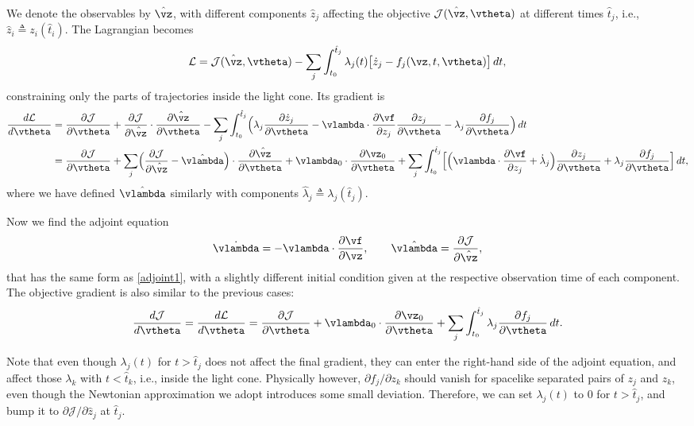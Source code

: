 \documentclass[modern, trackchanges, dvipsnames]{aastex631}
\renewcommand{\d}{d}
\newcommand{\p}{\partial}
\newcommand{\cJ}{\mathcal{J}}
\newcommand{\cL}{\mathcal{L}}
\begin{document}
We denote the observables by $\hat\vz$, with different components $\hat
z_j$ affecting the objective $\cJ(\hat\vz, \vtheta)$ at different times
$\hat t_j$, i.e., $\hat z_i \triangleq z_i(\hat t_i)$.
The Lagrangian becomes
%
\begin{equation}
\cL = \cJ(\hat\vz, \vtheta)
- \sum_j \int_{t_0}^{\hat t_j} \lambda_j(t)
  \bigl[ \dot z_j - f_j(\vz, t, \vtheta) \bigr] \, \d t,
\end{equation}
%
constraining only the parts of trajectories inside the light cone.
Its gradient is
%
\begin{align}
\frac{\d\cL}{\d\vtheta}
&= \frac{\p\cJ}{\p\vtheta}
+ \frac{\p\cJ}{\p\hat\vz} \cdot \frac{\p\hat\vz}{\p\vtheta}
- \sum_j \int_{t_0}^{\hat t_j}
  \Bigl( \lambda_j \frac{\p\dot z_j}{\p\vtheta}
    - \vlambda \cdot \frac{\p\vf}{\p z_j} \frac{\p z_j}{\p\vtheta}
    - \lambda_j \frac{\p f_j}{\p\vtheta} \Bigr) \, \d t \\
%
&= \frac{\p\cJ}{\p\vtheta}
+ \sum_j \Bigl( \frac{\p\cJ}{\p\hat\vz} - \hat\vlambda \Bigr)
  \cdot \frac{\p\hat\vz}{\p\vtheta}
+ \vlambda_0 \cdot \frac{\p\vz_0}{\p\vtheta}
+ \sum_j \int_{t_0}^{\hat t_j} \Bigl[
  \Bigl( \vlambda \cdot \frac{\p\vf}{\p z_j} + \dot\lambda_j \Bigr)
  \frac{\p z_j}{\p\vtheta}
  + \lambda_j \frac{\p f_j}{\p\vtheta} \Bigr] \, \d t, \nonumber
\end{align}
%
where we have defined $\hat\vlambda$ similarly with components
$\hat\lambda_j \triangleq \lambda_j(\hat t_j)$.

Now we find the adjoint equation
%
\begin{equation}
\dot\vlambda = - \vlambda \cdot \frac{\p\vf}{\p\vz},
\qquad
\hat\vlambda = \frac{\p\cJ}{\p\hat\vz},
\end{equation}
%
that has the same form as \eqref{adjoint1}, with a slightly different
initial condition given at the respective observation time of each
component.
The objective gradient is also similar to the previous cases:
%
\begin{equation}
\frac{\d\cJ}{\d\vtheta}
= \frac{\d\cL}{\d\vtheta}
= \frac{\p\cJ}{\p\vtheta} + \vlambda_0 \cdot \frac{\p\vz_0}{\p\vtheta}
+ \sum_j \int_{t_0}^{\hat t_j} \lambda_j \frac{\p f_j}{\p\vtheta} \, \d t.
\end{equation}

Note that even though $\lambda_j(t)$ for $t > \hat t_j$ does not affect
the final gradient, they can enter the right-hand side of the adjoint
equation, and affect those $\lambda_k$ with $t < \hat t_k$, i.e., inside
the light cone.
Physically however, $\p f_j / \p z_k$ should vanish for spacelike
separated pairs of $z_j$ and $z_k$, even though the Newtonian
approximation we adopt introduces some small deviation.
Therefore, we can set $\lambda_j(t)$ to 0 for $t > \hat t_j$, and bump
it to $\p\cJ / \p\hat z_j$ at $\hat t_j$.
\end{document}
